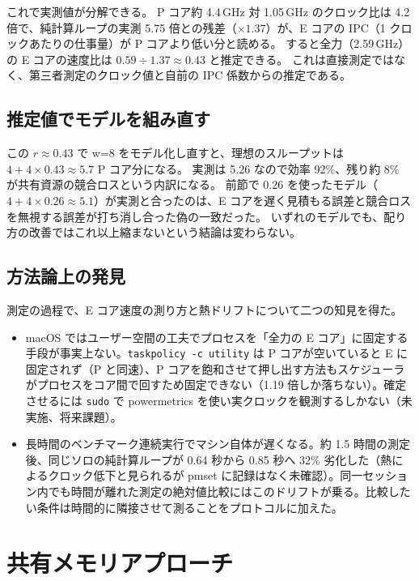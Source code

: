 これで実測値が分解できる。
P コア約 4.4\,GHz 対 1.05\,GHz のクロック比は 4.2 倍で、純計算ループの実測 5.75 倍との残差（$\times1.37$）が、E コアの IPC（1 クロックあたりの仕事量）が P コアより低い分と読める。
すると全力（2.59\,GHz）の E コアの速度比は $0.59 \div 1.37 \approx 0.43$ と推定できる。
これは直接測定ではなく、第三者測定のクロック値と自前の IPC 係数からの推定である。

\subsection{推定値でモデルを組み直す}

この $r \approx 0.43$ で w=8 をモデル化し直すと、理想のスループットは $4 + 4\times0.43 \approx 5.7$ P コア分になる。
実測は 5.26 なので効率 92\%、残り約 8\% が共有資源の競合ロスという内訳になる。
前節で 0.26 を使ったモデル（$4 + 4\times0.26 \approx 5.1$）が実測と合ったのは、E コアを遅く見積もる誤差と競合ロスを無視する誤差が打ち消し合った偽の一致だった。
いずれのモデルでも、配り方の改善ではこれ以上縮まないという結論は変わらない。

\subsection{方法論上の発見}

測定の過程で、E コア速度の測り方と熱ドリフトについて二つの知見を得た。

\begin{itemize}
  \item macOS ではユーザー空間の工夫でプロセスを「全力の E コア」に固定する手段が事実上ない。\texttt{taskpolicy -c utility} は P コアが空いていると E に固定されず（P と同速）、P コアを飽和させて押し出す方法もスケジューラがプロセスをコア間で回すため固定できない（1.19 倍しか落ちない）。確定させるには \texttt{sudo} で powermetrics を使い実クロックを観測するしかない（未実施、将来課題）。
  \item 長時間のベンチマーク連続実行でマシン自体が遅くなる。約 1.5 時間の測定後、同じソロの純計算ループが 0.64 秒から 0.85 秒へ 32\% 劣化した（熱によるクロック低下と見られるが pmset に記録はなく未確認）。同一セッション内でも時間が離れた測定の絶対値比較にはこのドリフトが乗る。比較したい条件は時間的に隣接させて測ることをプロトコルに加えた。
\end{itemize}

\section{共有メモリアプローチ}
\label{sec:shm}

